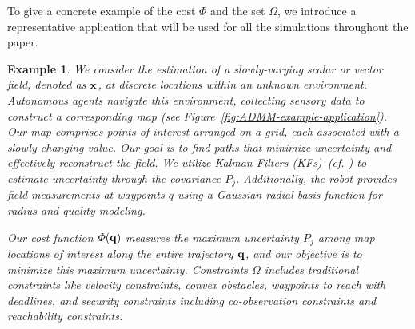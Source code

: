 \documentclass[journal]{IEEEtran}  %
\newtheorem{example}{Example}
\begin{document}
To give a concrete example of the cost $\varPhi$ and the set $\Omega$, we introduce a representative application that will be used for all the simulations throughout the paper.

\begin{example} 
We consider the estimation of a slowly-varying scalar or vector field, denoted as $\mathbf{x}$, at discrete locations within an unknown environment. Autonomous agents navigate this environment, collecting sensory data to construct a corresponding map (see Figure~\ref{fig:ADMM-example-application}). Our map comprises points of interest arranged on a grid, each associated with a slowly-changing value. Our goal is to find paths that minimize uncertainty and effectively reconstruct the field. We utilize Kalman Filters (KFs)~(cf. \cite{anderson2012optimal}) to estimate uncertainty through the covariance $P_j$. Additionally, the robot provides field measurements at waypoints $q$ using a Gaussian radial basis function for radius and quality modeling.



Our cost function $\varPhi(\mathbf{q})$ measures the maximum uncertainty $P_{j}$ among map locations of interest along the entire trajectory $\mathbf{q}$, and our objective is to minimize this maximum uncertainty. Constraints $\Omega$ includes traditional constraints like velocity constraints, convex obstacles, waypoints to reach with deadlines, and security constraints including co-observation constraints and reachability constraints.
\end{example}
\end{document}
